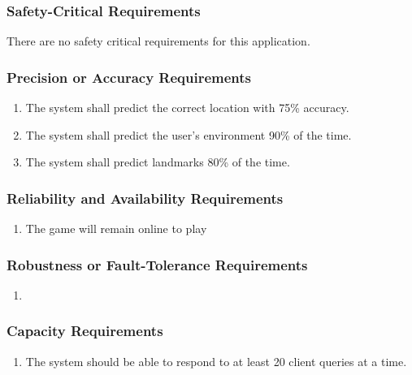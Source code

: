 \documentclass[titlepage]{article}
\begin{document}
\subsubsection{Safety-Critical Requirements}
\label{ssub:safety_critical_requirements}
There are no safety critical requirements for this application.

\subsubsection{Precision or Accuracy Requirements}
\label{ssub:precision_or_accuracy_requirements}
\begin{enumerate}
\item
The system shall predict the correct location with 75\% accuracy.
\item
The system shall predict the user's environment 90\% of the time.
\item
The system shall predict landmarks 80\% of the time.
\end{enumerate}

\subsubsection{Reliability and Availability Requirements}
\label{ssub:reliability_and_availability_requirements}
\begin{enumerate}[{PR}1. ]
	\item
	The game will remain online to play 
\end{enumerate}

\subsubsection{Robustness or Fault-Tolerance Requirements}
\label{ssub:robustness_or_fault_tolerance_requirements}
\begin{enumerate}[{PR}1. ]
	\item 
\end{enumerate}

\subsubsection{Capacity Requirements}
\label{ssub:capacity_requirements}
\begin{enumerate}[{PR}1. ]
	\item 
	The system should be able to respond to at least 20 client queries at a time.
\end{enumerate}
\end{document}
